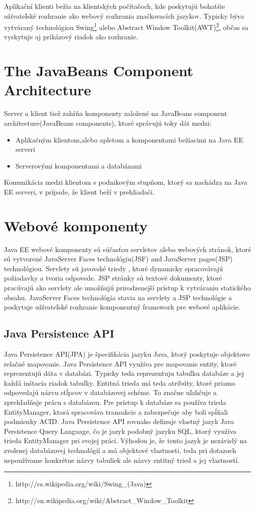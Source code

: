 Aplikační klienti bežia na klientských počítačoch, kde poskytujú bohatšie užívateľské rozhranie ako webový rozhrania značkovacích jazykov.
Typicky býva vytváraný technológiou Swing\footnote{http://cs.wikipedia.org/wiki/Swing\_(Java)} alebo Abstract Window Toolkit(AWT)\footnote{http://en.wikipedia.org/wiki/Abstract\_Window\_Toolkit}, občas sa vyskytuje aj prikázový riadok ako rozhranie.

\section{The JavaBeans Component Architecture}
Server a klient tiež zahŕňa komponenty založené na JavaBeans component architecture(JavaBeans components), ktoré správujú toky dát medzi:
\begin{itemize}
\item Aplikačným klientom,alebo apletom a komponentami bežiacimi na Java EE serveri
\item Serverovými komponentami a databázami
\end{itemize}


Komunikácia medzi klientom s podnikovým stupňom, ktorý sa nachádza na Java EE serveri, v prípade, že klient beží v prehliadači.

\section{Webové komponenty}
Java EE webové komponenty sú súčasťou servletov alebo webových stránok, ktoré sú vytvorené JavaServer Faces technológiu(JSF) and JavaServer pages(JSP) technológiou.
Servlety sú javovské triedy , ktoré dynamicky spracovávajú požiadavky a tvoria odpovede. JSP stránky sú textové dokumenty, ktoré pracúvajú ako servlety ale umožňujú prirodzenejší prístup k vytváraniu statického obsahu. JavaServer Faces technológia stavia na servlety a JSP technológie a poskytuje užívateľské rozhranie komponentný framework pre webové aplikácie.


\subsection{Java Persistence API}
Java Persistence API(JPA) je špecifikácia jazyku Java, ktorý poskytuje objektovo relačné mapovanie. Java Persistence API využíva pre mapovanie entity, ktoré reprezentujú dáta v databázi. Typicky teda reprezentuju tabuľku databáze a jej každá inštacia riadok tabuľky. Entitná trieda má teda atribúty, ktoré priamo odpovedajú názvu stĺpcov v databázovej schéme. To značne uľahčuje a zprehľadňuje prácu s databázou. Pre prístup k databáze sa používa trieda EntityManager, ktorá spracováva transakcie a zabezpečuje aby boli spĺňali podmienky ACID. Java Persistence API rovnako definuje vlastný jazyk Java Persistence Query Language, čo je jazyk podobný jazyku SQL, ktorý využíva trieda EntityManager pri svojej práci. Výhodou je, že tento jazyk je nezávislý na zvolenej databázovej technológií a má objektové vlastnosti, teda pri dotazoch nepoužívame konkrétne názvy tabuliek ale názvy entitný tried a jej vlastností. 

